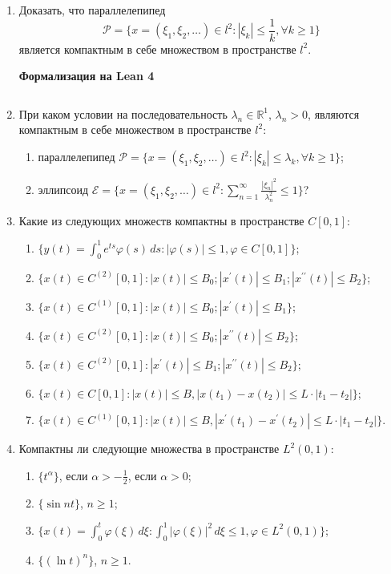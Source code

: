 \documentclass[12pt,a4paper]{article}
\begin{document}
\begin{enumerate}
\newpage
\item Доказать, что параллелепипед
$$ \mathcal{P} = \{x = (\xi_{1}, \xi_{2}, \dots) \in l^{2} : |\xi_{k}| \le \frac{1}{k}, \forall k \ge 1\} $$
является компактным в себе множеством в пространстве $l^{2}$.


\begin{center}\small\textbf{Формализация на Lean 4}\end{center}
\inputminted{lean}{FunAn/Section20_CompactSets/Task08.lean}

\newpage

\item При каком условии на последовательность $\lambda_{n} \in \mathbb{R}^{1}$, $\lambda_{n} > 0$, являются компактным в себе множеством в пространстве $l^{2}$:
\begin{enumerate}[label=\alph*)]
\item параллелепипед $\mathcal{P} = \{x = (\xi_{1}, \xi_{2}, \dots) \in l^{2} : |\xi_{k}| \le \lambda_{k}, \forall k \ge 1\}$;
\item эллипсоид $\mathcal{E} = \{x = (\xi_{1}, \xi_{2}, \dots) \in l^{2} : \sum_{n=1}^{\infty} \frac{|\xi_{n}|^{2}}{\lambda_{n}^{2}} \le 1\}$?
\end{enumerate}

\item Какие из следующих множеств компактны в пространстве $C[0,1]$:
\begin{enumerate}[label=\alph*)]
\item $\{y(t) = \int_{0}^{1} e^{ts}\varphi(s) \, ds : |\varphi(s)| \le 1, \varphi \in C[0,1]\}$;
\item $\{x(t) \in C^{(2)}[0,1] : |x(t)| \le B_{0}; |x^{\prime}(t)| \le B_{1}; |x^{\prime\prime}(t)| \le B_{2}\}$;
\item $\{x(t) \in C^{(1)}[0,1] : |x(t)| \le B_{0}; |x^{\prime}(t)| \le B_{1}\}$;
\item $\{x(t) \in C^{(2)}[0,1] : |x(t)| \le B_{0}; |x^{\prime\prime}(t)| \le B_{2}\}$;
\item $\{x(t) \in C^{(2)}[0,1] : |x^{\prime}(t)| \le B_{1}; |x^{\prime\prime}(t)| \le B_{2}\}$;
\item $\{x(t) \in C[0,1] : |x(t)| \le B, |x(t_{1}) - x(t_{2})| \le L \cdot |t_{1} - t_{2}|\}$;
\item $\{x(t) \in C^{(1)}[0,1] : |x(t)| \le B, |x^{\prime}(t_{1}) - x^{\prime}(t_{2})| \le L \cdot |t_{1} - t_{2}|\}$.
\end{enumerate}

\item Компактны ли следующие множества в пространстве $L^{2}(0,1)$:
\begin{enumerate}[label=\alph*)]
\item $\{t^{\alpha}\}$, если $\alpha > -\frac{1}{2}$, если $\alpha > 0$;
\item $\{\sin nt\}$, $n \ge 1$;
\item $\{x(t) = \int_{0}^{t} \varphi(\xi) \, d\xi : \int_{0}^{1} |\varphi(\xi)|^{2} \, d\xi \le 1, \varphi \in L^{2}(0,1)\}$;
\item $\{(\ln t)^{n}\}$, $n \ge 1$.
\end{enumerate}


\end{enumerate}
\end{document}
